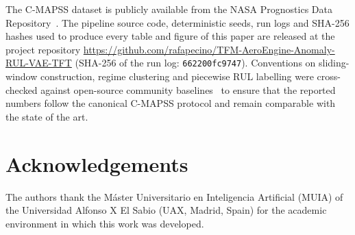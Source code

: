 \documentclass[5p,times,authoryear]{elsarticle}
\begin{document}
The C-MAPSS dataset is publicly available from the NASA Prognostics Data Repository~\citep{saxena2008damage}. The pipeline source code, deterministic seeds, run logs and SHA-256 hashes used to produce every table and figure of this paper are released at the project repository \url{https://github.com/rafapecino/TFM-AeroEngine-Anomaly-RUL-VAE-TFT} (SHA-256 of the run log: \texttt{662200fc9747}). Conventions on sliding-window construction, regime clustering and piecewise RUL labelling were cross-checked against open-source community baselines~\citep{panara_cmapss_repo,mohyunho_ncmapss_repo} to ensure that the reported numbers follow the canonical C-MAPSS protocol and remain comparable with the state of the art.

\section*{Acknowledgements}

The authors thank the M\'aster Universitario en Inteligencia Artificial (MUIA) of the Universidad Alfonso X El Sabio (UAX, Madrid, Spain) for the academic environment in which this work was developed.



\end{document}
